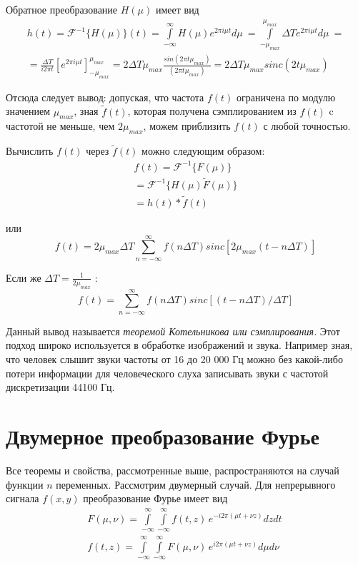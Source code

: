 \documentclass[oneside,final,14pt]{extreport}
\begin{document}
Обратное преобразование $H(\mu)$ имеет вид
\begin{gather*}
h(t)
=
\mathcal{F}^{-1}\{H(\mu)\}(t)
=
\int\limits_{-\infty}^{\infty}
H(\mu)
e^{2\pi i \mu t }
d\mu~
=
\int\limits_{-\mu_{max}}^{\mu_{max}}
\varDelta T
e^{2\pi i \mu t }
d\mu~
=
\\
=
\frac{\varDelta T}
{i 2 \pi t} 
\left[
e^{	2\pi i \mu t }
\right]_{-\mu_{max}}^{\mu_{max}}
=
2\varDelta T \mu_{max}
\frac{sin(2\pi t \mu_{max}) }{(2\pi t \mu_{max})}
=
2\varDelta T \mu_{max}
sinc(2t\mu_{max})
\end{gather*}

Отсюда следует вывод:  допуская, что частота $f(t)$ ограничена по модулю значением $\mu_{max}$, зная $\tilde{f}(t)$, которая получена сэмплированием из $f(t)$ c частотой не меньше, чем $2 \mu_{max}$,  можем приблизить $f(t)$ с любой точностью. 

Вычислить $f(t)$ через $\tilde{f}(t)$ можно следующим образом:
\begin{gather*}
f(t)
=
\mathcal{F}^{-1}
\{ F(\mu) \}
\\
=
\mathcal{F}^{-1}
\{
H(\mu)\tilde{F}(\mu)
\}
\\
=
h(t)*\tilde{f}(t)
\end{gather*}

или 
\begin{equation}
f(t) 
=
2  \mu_{max} \varDelta T
\sum_{ n = - \infty}^{\infty}
f(n \varDelta T ) 
sinc[ 2  \mu_{max}  (t - n \varDelta T) 	]
\end{equation}

Если же $ \varDelta T = \frac{1}{2 \mu_{max}} $ :
\begin{equation}
f(t) 
=
\sum_{ n = - \infty}^{\infty}
f(n \varDelta T ) 
sinc[ (t - n \varDelta T) / \varDelta T	]  
\end{equation}

Данный вывод называется \textit{теоремой Котельникова или сэмплирования.} 
Этот подход широко используется в обработке изображений и звука. Например зная, что человек слышит звуки частоты от 16 до 20 000 Гц можно без какой-либо потери информации для человеческого слуха записывать звуки с частотой дискретизации 44100 Гц.

\section{Двумерное преобразование Фурье}
Все теоремы и свойства, рассмотренные выше, распространяются на случай функции $n$ переменных. Рассмотрим двумерный случай. Для непрерывного сигнала $f(x,y)$ преобразование Фурье имеет вид
\begin{gather}
\label{FFT_2d}
F(\mu,\nu)
=
\int\limits_{-\infty}^{\infty}
\int\limits_{-\infty}^{\infty}
f(t,z) \,
e^{-i 2 \pi( \mu t + \nu z)}
dz dt~
\\
\label{IFFT_2d}
f(t,z)
=
\int\limits_{-\infty}^{\infty}
\int\limits_{-\infty}^{\infty}
F(\mu,\nu) \,
e^{i 2 \pi( \mu t + \nu z)}
d\mu d\nu~
\end{gather}
\end{document}
